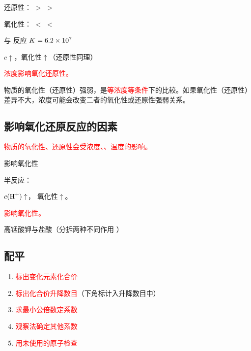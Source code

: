             还原性： \(>\)  \(>\) 

            氧化性： \(<\)  \(<\) 

            \begin{xmp}[先后律例]{ 与  反应}
                \qquad \(K = \num{6.2E7}\)

                \(c\uparrow\)，氧化性\(\uparrow\)（还原性同理）

                \textcolor{red}{浓度影响氧化还原性。}

                物质的氧化性（还原性）强弱，是\textcolor{red}{等浓度等条件}下的比较。如果氧化性（还原性）差异不大，浓度可能会改变二者的氧化性或还原性强弱关系。
            \end{xmp}

    \subsection{影响氧化还原反应的因素}\label{subsec:影响氧化还原反应的因素}

        \textcolor{red}{物质的氧化性、还原性会受浓度、、温度的影响。}

        \begin{xmp}[H+ 影响]{ 影响氧化性}

            半反应：

            \(c(\cemh{H+})\uparrow\)， 氧化性\(\uparrow\)。

            \textcolor{red}{ 影响氧化性。}
        \end{xmp}

        \begin{xmp}[配平例 5]{高锰酸钾与盐酸（分拆两种不同作用 ）}
        \end{xmp}

    \subsection{配平}\label{subsec:配平}

        \begin{enumerate}[label=\Roman*]
            \item \textcolor{red}{标出变化元素化合价}
            \item \textcolor{red}{标出化合价升降数目}（下角标计入升降数目中）
            \item \textcolor{red}{求最小公倍数定系数}
            \item \textcolor{red}{观察法确定其他系数}
            \item \textcolor{red}{用未使用的原子检查}
        \end{enumerate}


